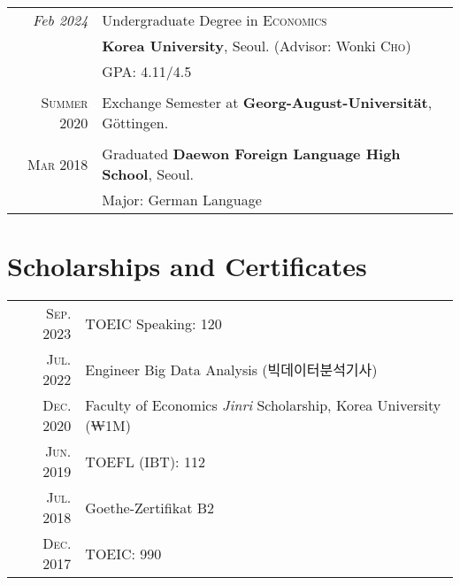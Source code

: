 \documentclass[a4paper,10pt]{article} %
\begin{document}
\begin{tabular}{rl}	

\emph{Feb 2024} & Undergraduate Degree in \textsc{}\textsc{Economics}
\\& \normalsize\textbf{Korea University}, Seoul.
\small (Advisor: Wonki \textsc{Cho})\\
&\normalsize \textsc{GPA}: 4.11/4.5 \\
&\\


\textsc{Summer} 2020 & Exchange Semester at \textbf{Georg-August-Universität},
Göttingen.\\
&\\


\textsc{Mar} 2018& Graduated \textbf{Daewon
Foreign Language High School}, Seoul.\\
&Major: German Language\\
\end{tabular}


\section{Scholarships and Certificates}

\begin{tabular}{rl}
    \textsc{Sep.} 2023 & TOEIC Speaking: 120 \\

\textsc{Jul.} 2022 & Engineer Big Data Analysis (빅데이터분석기사)\\

\textsc{Dec.} 2020 & Faculty of Economics \textit{Jinri} Scholarship, Korea
University
\footnotesize(₩1M)\normalsize\\

\textsc{Jun.} 2019 & TOEFL (IBT): 112\\

\textsc{Jul.} 2018 & Goethe-Zertifikat B2\\

\textsc{Dec.} 2017 & TOEIC: 990\\
\end{tabular}
\end{document}
